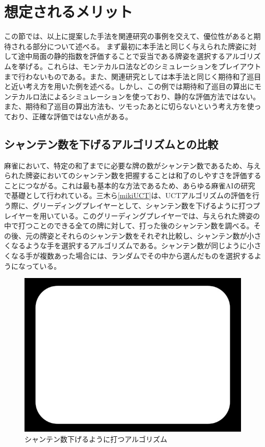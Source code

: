 \section{想定されるメリット}
この節では、以上に提案した手法を関連研究の事例を交えて、優位性があると期待される部分について述べる。
まず最初に本手法と同じく与えられた牌姿に対して途中局面の静的指数を評価することで妥当である牌姿を選択するアルゴリズムを挙げる。これらは、モンテカルロ法などのシミュレーションをプレイアウトまで行わないものである。また、関連研究としては本手法と同じく期待和了巡目と近い考え方を用いた例を述べる。しかし、この例では期待和了巡目の算出にモンテカルロ法によるシミュレーションを使っており、静的な評価方法ではない。また、期待和了巡目の算出方法も、ツモったあとに切らないという考え方を使っており、正確な評価ではない点がある。


\subsection{シャンテン数を下げるアルゴリズムとの比較}
麻雀において、特定の和了までに必要な牌の数がシャンテン数であるため、与えられた牌姿においてのシャンテン数を把握することは和了のしやすさを評価することにつながる。これは最も基本的な方法であるため、あらゆる麻雀AIの研究で基礎として行われている。三木ら\ref{mikiUCT}は、UCTアルゴリズムの評価を行う際に、グリーディングプレイヤーとして、シャンテン数を下げるように打つプレイヤーを用いている。このグリーディングプレイヤーでは、与えられた牌姿の中で打つことのできる全ての牌に対して、打った後のシャンテン数を調べる。その後、元の牌姿とそれらのシャンテン数をそれぞれ比較し、シャンテン数が小さくなるような手を選択するアルゴリズムである。シャンテン数が同じように小さくなる手が複数あった場合には、ランダムでその中から選んだものを選択するようになっている。

\begin{figure}[h]
 \centering
 \includegraphics[keepaspectratio, scale=0.5,bb=0 0 620 439]
      {img/zu.jpg}
 \caption{シャンテン数下げるように打つアルゴリズム}
 \label{zu}
\end{figure}

